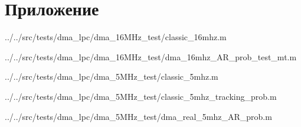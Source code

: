 \appendix

\chapter*{Приложение}
\label{app:1}


{../../src/tests/dma_lpc/dma_16MHz_test/classic_16mhz.m}


{../../src/tests/dma_lpc/dma_16MHz_test/dma_16mhz_AR_prob_test_mt.m}



{../../src/tests/dma_lpc/dma_5MHz_test/classic_5mhz.m}


{../../src/tests/dma_lpc/dma_5MHz_test/classic_5mhz_tracking_prob.m}


{../../src/tests/dma_lpc/dma_5MHz_test/dma_real_5mhz_AR_prob.m}

